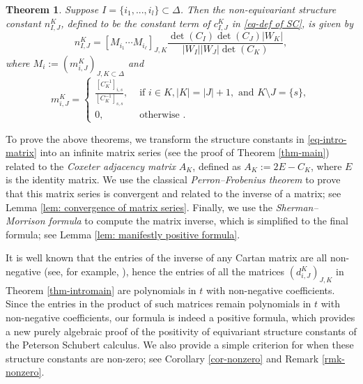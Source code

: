 \documentclass[11pt, letterpaper]{amsart}
\numberwithin{equation}{section}
\newtheorem{theorem}{Theorem}[section]
\begin{document}
\begin{theorem} \label{thm-introNmain}
 Suppose $I=\{i_1, ..., i_l\} \subset \Delta$. Then the non-equivariant structure constant $n_{I, J}^K$, defined to be the constant term of $c_{I, J}^K$ in \eqref{eq-def of SC}, is given by 
 $$
n_{I, J}^K=\left[M_{i_1} \cdots M_{i_{\ell}}\right]_{J, K} \frac{\operatorname{det}\left(C_I\right) \operatorname{det}\left(C_J\right)\left|W_K\right|}{\left|W_I\right|\left|W_J\right| \operatorname{det}\left(C_K\right)},
$$ where $M_i:=(m^{K}_{i, J})_{J, K\subset\Delta}$ and 
\begin{equation} \label{eq-intro-Nmatrix}
m^{K}_{i, J}=\begin{cases}
\frac{[C_{K}^{-1}]_{i,s}}{[C_{K}^{-1}]_{s,s}}, &\text{ if } i\in K, |K|=|J|+1, \text{ and } K\setminus J=\{s\},\\
0, &\text{ otherwise }.
\end{cases}
\end{equation}
\end{theorem}

To prove the above theorems, we transform the structure constants in \eqref{eq-intro-matrix} into an infinite matrix series (see the proof of Theorem \ref{thm-main}) related to the \emph{Coxeter adjacency matrix} $A_K$, defined as $A_K:=2E-C_K$, where $E$ is the identity matrix. We use the classical \emph{Perron--Frobenius theorem} to prove that this matrix series is convergent and related to the inverse of a matrix; see Lemma \ref{lem: convergence of matrix series}. Finally, we use the \emph{Sherman--Morrison formula} to compute the matrix inverse, which is simplified to the final formula; see Lemma \ref{lem: manifestly positive formula}.

It is well known that the entries of the inverse of any Cartan matrix are all non-negative (see, for example, \cite[Exercise 13.8]{humphreys1972}), hence the entries of all the matrices $(d^{K}_{i, J})_{J, K}$ in Theorem \ref{thm-intromain} are polynomials in $t$ with non-negative coefficients.
Since the entries in the product of such matrices remain polynomials in $t$ with non-negative coefficients, our formula is indeed a positive formula, which provides a new purely algebraic proof of the positivity of equivariant structure constants of the  Peterson Schubert calculus. We also provide a simple criterion for when these structure constants are non-zero; see Corollary \ref{cor-nonzero} and Remark \ref{rmk-nonzero}.
\end{document}
